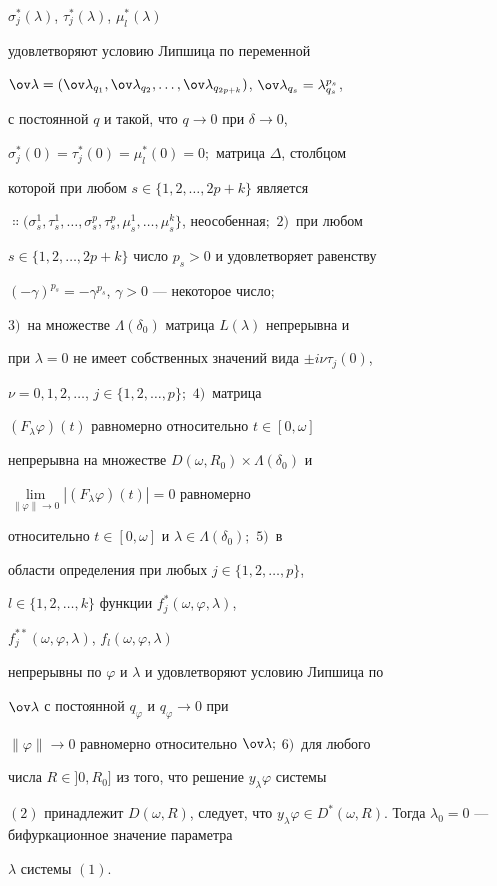 \begin{thm}
$\sigma^*_j(\lambda)$, $\tau^*_j(\lambda)$, $\mu^*_l(\lambda)$ 


удовлетворяют условию Липшица по переменной 


$\ov\lambda=(\ov\lambda_{q_1},\ov\lambda_{q_2}, 


\dotsc,\ov\lambda_{q_{2p+k}})$, $\ov\lambda_{q_s}=\lambda^{p_s}_{q_s}$, 


с постоянной $q$ и такой, что $q\to 0$ при $\delta\to 0$, 


$\sigma^*_j(0)=\tau^*_j(0)=\mu^*_l(0)=0;$ матрица $\Delta$, столбцом 


которой при любом $s\in\{1,2,\dotsc,2p+k\}$ является 


$\Colon(\sigma^1_s,\tau^1_s,\dotsc,\sigma^p_s,\tau^p_s, 


\mu^1_s,\dotsc,\mu^k_s\}$, неособенная$;$ $2)$~при любом 


$s\in\{1,2,\dotsc,2p+k\}$ число $p_s>0$ и удовлетворяет равенству 


$(-\gamma)^{p_s}=-\gamma^{p_s}$, $\gamma>0$ --- некоторое число$;$ 


$3)$~на множестве $\Lambda(\delta_0)$ матрица $L(\lambda)$ непрерывна и 


при $\lambda=0$ не имеет собственных значений вида $\pm i\nu\tau_j(0)$, 


$\nu=0,1,2,\dotsc$, $j\in\{1,2,\dotsc,p\};$ $4)$~матрица 


$(F_\lambda\varphi)(t)$ равномерно относительно $t\in[0,\omega]$ 


непрерывна на множестве $D(\omega,R_0)\times\Lambda(\delta_0)$ и 


$\lim\limits_{\|\varphi\|\to0}|(F_\lambda\varphi)(t)|=0$ равномерно 


относительно $t\in[0,\omega]$ и $\lambda\in\Lambda(\delta_0);$ $5)$~в 


области определения при любых $j\in\{1,2,\dotsc,p\}$, 


$l\in\{1,2,\dotsc,k\}$ функции $f^*_j(\omega,\varphi,\lambda)$, 


$f^{**}_j(\omega,\varphi,\lambda)$, $f_l(\omega,\varphi,\lambda)$ 


непрерывны по $\varphi$ и $\lambda$ и удовлетворяют условию Липшица по 


$\ov\lambda$ с постоянной $q_\varphi$ и $q_\varphi\to0$ при 


$\|\varphi\|\to0$ равномерно относительно $\ov\lambda;$ $6)$~для любого 


числа $R\in]0,R_0]$ из того, что решение $y_\lambda\varphi$ системы 


$(2)$ принадлежит $D(\omega,R)$, следует, что $y_\lambda\varphi\in 


D^*(\omega,R)$. Тогда $\lambda_0=0$ --- бифуркационное значение параметра 


$\lambda$ системы $(1)$. 


\end{thm} 


